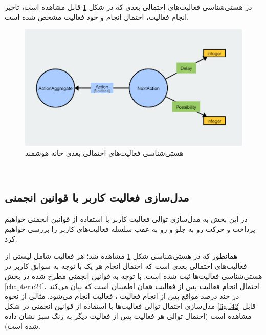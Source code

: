 \begin{itemize}
در هستی‌شناسی فعالیت‌های احتمالی بعدی که در شکل \ref{fig:f408} قابل مشاهده است، تاخیر انجام فعالیت، احتمال انجام و خود فعالیت مشخص شده است.

\begin{figure}[htp]
\centerline{\includegraphics[width=1\textwidth]{figs/f408.png}}
\caption{هستی‌شناسی فعالیت‌های احتمالی بعدی خانه هوشمند}
\label{fig:f408}
\end{figure}

‌\end{itemize}

\subsection{‌مدل‌سازی فعالیت کاربر با قوانین انجمنی}\label{chapter:c442}

در این بخش به مدل‌سازی توالی فعالیت کاربر با استفاده از قوانین انجمنی خواهیم پرداخت و حرکت رو به جلو و رو به عقب سلسله فعالیت‌های کاربر را بررسی خواهیم کرد.

همانطور که در هستی‌شناسی شکل \ref{fig:f408} مشاهده شد؛ هر فعالیت شامل لیستی از فعالیت‌های احتمالی بعدی است که احتمال انجام هر یک با توجه به سوابق کاربر در هستی‌شناسی فعالیت‌ها ثبت شده است. با توجه به قوانین انجمنی مطرح شده در بخش \ref{chapter:c24}، احتمال انجام فعالیت  پس از فعالیت  همان اطمینان است که بیان می‌کند در چند درصد مواقع پس از انجام فعالیت ، فعالیت  انجام می‌شود. مثالی از نحوه مدل‌سازی احتمال توالی فعالیت‌ها با استفاده از قوانین انجمنی در شکل \ref{fig:f42} قابل مشاهده است (احتمال توالی هر فعالیت پس از فعالیت دیگر به رنگ سبز نشان داده شده است). 

